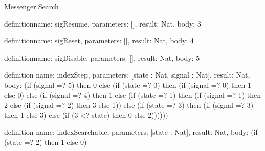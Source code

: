 \begin{lexlean}{Messenger.Search}
\begin{semanticmodule}
definition{name: sigResume, parameters: [], result: Nat, body: 3}

definition{name: sigReset, parameters: [], result: Nat, body: 4}

definition{name: sigDisable, parameters: [], result: Nat, body: 5}

definition{
  name: indexStep,
  parameters: [state : Nat, signal : Nat],
  result: Nat,
  body: (if (signal =? 5) then 0 else (if (state =? 0) then (if (signal =? 0) then 1 else 0) else (if (signal =? 4) then 1 else (if (state =? 1) then (if (signal =? 1) then 2 else (if (signal =? 2) then 3 else 1)) else (if (state =? 3) then (if (signal =? 3) then 1 else 3) else (if (3 <? state) then 0 else 2))))))
}

definition{
  name: indexSearchable,
  parameters: [state : Nat],
  result: Nat,
  body: (if (state =? 2) then 1 else 0)
}
\end{semanticmodule}
\end{lexlean}

